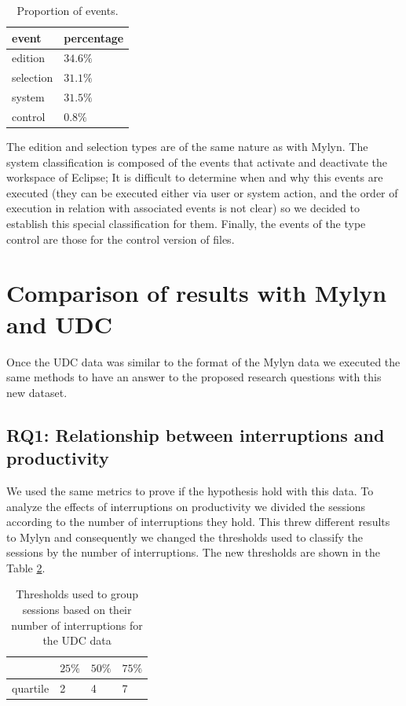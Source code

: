 \documentclass[conference]{IEEEtran}
\begin{document}
\begin{table}[ht!]
\renewcommand{\arraystretch}{1.3}
\caption{Proportion of events. }
\label{tbl:prop_events_udc}
\centering
\begin{tabular}{|p{1.7cm}|p{2 cm}|} 
  \hline 
event & percentage \\  
  \hline 
    \hline 
edition &  $34.6\%$  \\
selection & $31.1\%$ \\
system & $31.5\%$  \\
control & $0.8\%$  \\
\hline
\end{tabular}

\end{table}

The edition and selection types are of the same nature as with Mylyn. The system classification is composed of the events that activate and deactivate the workspace of Eclipse; It is difficult to determine when and why this events are executed (they can be executed either via user or system action, and the order of execution in relation with associated events is not clear) so we decided to establish this special classification for them. Finally, the events of the type control are those for the control version of files. 

\section{Comparison of results with Mylyn and UDC}
Once the UDC data was similar to the format of the Mylyn data we executed the same methods to have an answer to the proposed research questions with this new dataset.

\subsection{RQ1: Relationship between interruptions and productivity}
We used the same metrics to prove if the hypothesis hold with this data. To analyze the effects of interruptions on productivity we divided the sessions according to the number of interruptions they hold. This threw different results to Mylyn and consequently we changed the thresholds used to classify the sessions by the number of interruptions. The new thresholds are shown in the Table \ref{tbl:quartil_int_udc}.

\begin{table}[ht!]
\renewcommand{\arraystretch}{1.3}
\caption{Thresholds used to group sessions based on their number of interruptions for the UDC data} %
\label{tbl:quartil_int_udc}
\centering
\begin{tabular}{l | p{0.6cm} | p{0.6cm} | p{0.6cm}} 
     & $25\%$ & $50\%$ & $75\%$ \\  
  \hline 
  quartile &  2 & 4 & 7  \\   
\end{tabular}
\end{table}
\end{document}

